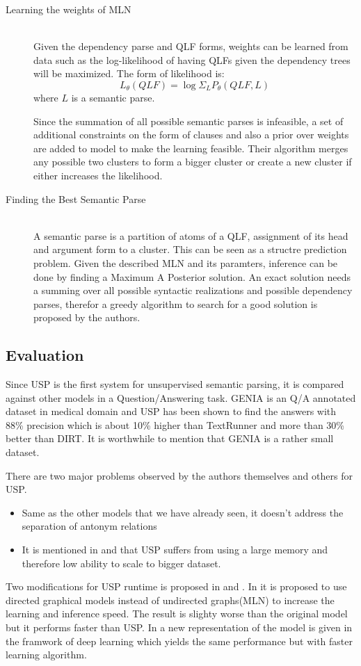 \documentclass[12pt]{report}
\begin{document}
\begin{description}
  \item[Learning the weights of MLN] \hfill \\
  Given the dependency parse and QLF forms, weights can be learned from data such as the log-likelihood
  of having QLFs given the dependency trees will be maximized. The form of likelihood is:
  $$ L_{\theta}(QLF) = \log{\Sigma_L{P_\theta{(QLF, L)}}}$$ where $L$ is a semantic parse.
  
  Since the summation of all possible semantic parses is infeasible, a set of additional constraints on the form
  of clauses and also a prior over weights are added to model to make the learning feasible. Their algorithm
  merges any possible two clusters to form a bigger cluster or create a new cluster if either increases the likelihood.
  \item[Finding the Best Semantic Parse] \hfill \\
  A semantic parse is a partition of atoms of a QLF, assignment of its head and argument form to a cluster. 
  This can be seen as a structre prediction problem. Given the described MLN and its paramters, inference can
   be done by finding a Maximum A Posterior solution. An exact solution needs a summing over all possible syntactic realizations and
   possible dependency parses, therefor a greedy algorithm to search for a good solution is proposed 
   by the authors.   
\end{description}

\subsection {Evaluation}
\label{ch:evaluation}
Since USP is the first system for unsupervised semantic parsing, it is compared against other models in a Question/Answering task.
GENIA is an Q/A annotated dataset in medical domain and USP has been shown to find the answers with 88\% precision
which is about 10\% higher than TextRunner and more than 30\% better than DIRT. It is worthwhile to mention that
GENIA is a rather small dataset.

There are two major problems observed by the authors themselves and others for USP.
\begin{itemize}
 \item Same as the other models that we have already seen,
 it doesn't address the separation of antonym relations
 \item It is mentioned in \cite{Yao2011} and \cite{Titov2011}
  that USP suffers from using a large memory and therefore low ability to scale to bigger dataset. 
 \end{itemize}
 Two modifications for USP runtime is proposed in \cite{Poon2013} and \cite{Titov2011}.
  In \cite{Titov2011}
   it is proposed to use directed graphical models instead of undirected graphs(MLN) to increase the learning and inference speed.
  The result is slighty worse than the original model but it performs faster than USP.
  In \cite{Poon2013} 
  a new representation of the model is given in the framwork of deep learning which yields 
  the same performance but with faster learning algorithm.
  
\end{document}
